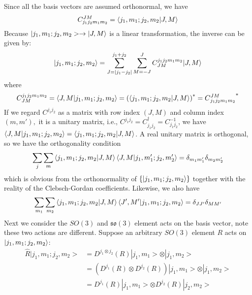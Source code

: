 \documentclass{article}
\begin{document}
	Since all the basis vectors are assumed orthonormal, we have
	\begin{equation*}
		C_{j_{1} j_{2} m_{1} m_{2}}^{JM} =\bra{j_{1} ,m_{1} ;j_{2} ,m_{2}}\ket{J,M}
	\end{equation*}
	Because $| j_{1} ,m_{1} ;j_{2} ,m_{2}> \rightarrow \ket{J,M}$ is a linear transformation, the inverse can be given by:
	\begin{equation*}
		\ket{j_{1} ,m_{1} ;j_{2} ,m_{2}} =\sum _{J=| j_{1} -j_{2}| }^{j_{1} +j_{2}}\sum _{M=-J}^{J} C_{JM}^{j_{1} j_{2} m_{1} m_{2}} |J,M\rangle 
	\end{equation*}
	where
	\begin{equation*}
		C_{JM}^{j_{1} j_{2} m_{1} m_{2}} =\bra{J,M}\ket{j_{1} ,m_{1} ;j_{2} ,m_{2}} =\left(\bra{j_{1} ,m_{1} ;j_{2} ,m_{2}}\ket{J,M}\right)^{*} =C{_{j_{1} j_{2} m_{1} m_{2}}^{JM}}^{*}
	\end{equation*}
	If we regard $C^{j_{1} j_{2}}$ as a matrix with row index $(J,M)$ and column index $( m,m') ,$ it is a unitary matrix, i.e., $C^{j_{1} j_{2}} =C_{j_{1} j_{2}}^{\dagger } =C_{j_{1} j_{2}}^{-1}$, we have $\bra{J,M}\ket{j_{1} ,m_{1} ;j_{2} ,m_{2}} =\bra{j_{1} ,m_{1} ;j_{2} ,m_{2}}\ket{J,M}$. A real unitary matrix is orthogonal, so we have the orthogonality condition
	\begin{equation*}
		\sum _{j}\sum _{m}\bra{j_{1} ,m_{1} ;j_{2} ,m_{2}}\ket{J,M}\bra{J,M}\ket{j_{1} ,m'_{1} ;j_{2} ,m'_{2}} =\delta _{m_{1} m'_{1}} \delta _{m_{2} m'_{2}}
	\end{equation*}
	which is obvious from the orthonormality of $\left\{\ket{j_{1} ,m_{1} ;j_{2} ,m_{2}}\right\}$ together with the reality of the Clebsch-Gordan coefficients. Likewise, we also have
	\begin{equation*}
		\sum _{m_{1}}\sum _{m_{2}}\bra{j_{1} ,m_{1} ;j_{2} ,m_{2}}\ket{J,M}\bra{J',M'}\ket{j_{1} ,m_{1} ;j_{2} ,m_{2}} =\delta _{JJ'} \delta _{MM'}
	\end{equation*}
	Next we consider the $SO( 3)$ and $\mathfrak{so}( 3)$ element acts on the basis vector, note these two actions are different. Suppose an arbitrary $SO( 3)$ element $R$ acts on $\ket{j_{1} ,m_{1} ;j_{2} ,m_{2}}$:
	\begin{equation*}
		\begin{aligned}
			\hat{R}| j_{1} ,m_{1} ;j_{2} ,m_{2}>  & =D^{j_{1} \otimes j_{2}} (R)| j_{1} ,m_{1}> \otimes | j_{1} ,m_{2}> \\
			& =\left( D^{j_{1}} (R)\otimes D^{j_{2}} (R)\right)| j_{1} ,m_{1}> \otimes | j_{1} ,m_{2}> \\
			& =D^{j_{1}} (R)| j_{1} ,m_{1}> \otimes D^{j_{2}} (R)| j_{2} ,m_{2}> 
		\end{aligned}
	\end{equation*}
\end{document}
